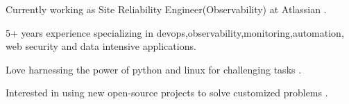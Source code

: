 

\begin{cvparagraph}

Currently working as Site Reliability Engineer(Observability) at Atlassian .

 5+ years experience specializing in devops,observability,monitoring,automation, web security and data intensive applications.

 Love harnessing the power of python and linux for challenging tasks .

 Interested in using new open-source projects to solve customized problems .
\end{cvparagraph}
